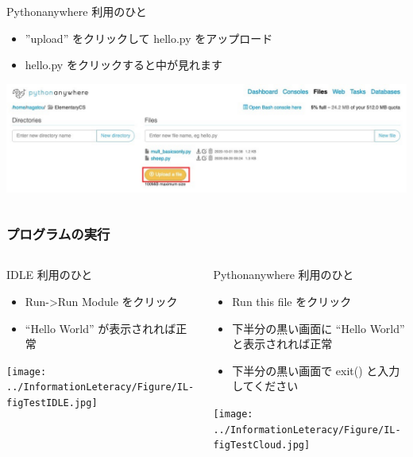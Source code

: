 \begin{frame}
\begin{columns}[t]
\begin{column}{0.5\textwidth}
\begin{itembox}{\footnotesize Pythonanywhere 利用のひと}
\begin{itemize}
\item ''upload'' をクリックして hello.py をアップロード
\item hello.py をクリックすると中が見れます
        \end{itemize}
\includegraphics[width=1\textwidth]{./Figure/elementaryCS-figUpload.jpg}
      \end{itembox}
    \end{column}
  \end{columns}
\end{frame}
\begin{frame}
\frametitle{プログラムの実行}
  \begin{columns}[t]
    \begin{column}{0.5\textwidth}
      \begin{itembox}{\footnotesize IDLE 利用のひと}
        \begin{itemize}
\scriptsize
\item Run->Run Module をクリック
\item ``Hello World'' が表示されれば正常
        \end{itemize}
\texttt{[image: ../InformationLeteracy/Figure/IL-figTestIDLE.jpg]}
      \end{itembox}
    \end{column}
    \begin{column}{0.5\textwidth}
      \begin{itembox}{\footnotesize Pythonanywhere 利用のひと}
\scriptsize
        \begin{itemize}
\item Run this file をクリック
\item 下半分の黒い画面に ``Hello World'' と表示されれば正常
\item 下半分の黒い画面で exit() と入力してください
        \end{itemize}
\texttt{[image: ../InformationLeteracy/Figure/IL-figTestCloud.jpg]}
      \end{itembox}
    \end{column}
  \end{columns}
\end{frame}
